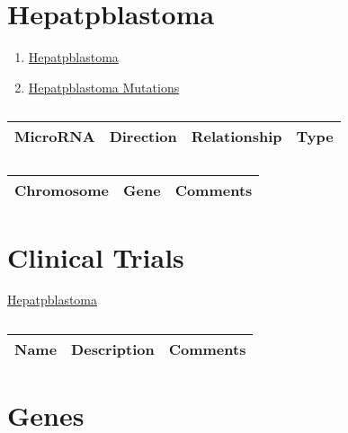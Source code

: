 \section{Hepatpblastoma}

\begin{enumerate}
\item \href{https://www.malacards.org/card/Hepatpblastoma}{Hepatpblastoma}
\item \href{https://cancer.sanger.ac.uk/cosmic/search?q=Hepatpblastoma}{Hepatpblastoma Mutations}
\end{enumerate}

\begin{table}[H]\centering
  \caption {\cite{key400} \cite{480}}
	\begin{tabular}{p{1cm}p{4cm}p{3cm}}
		 MicroRNA & Direction & Relationship & Type\\
		\hline
		
	\end{tabular}
\end{table}




\begin{table}[H]\centering
  \caption {\cite{key450}}
	\begin{tabular}{p{1cm}p{4cm}p{3cm}}
		Chromosome & Gene & Comments\\
		\hline

		\hline
	\end{tabular}
\end{table}


\section{Clinical Trials}

\href{https://clinicaltrials.gov/ct2/results?cond=Hepatpblastoma&term=&cntry=&state=&city=&dist=}{Hepatpblastoma}

\begin{table}[H]\centering
  \caption {\cite{key460}}
	\begin{tabular}{p{1cm}p{4cm}p{3cm}}
		Name & Description & Comments\\
		\hline
		\hline
	\end{tabular}
\end{table}

\section{Genes}

